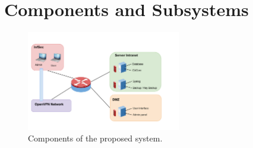 \documentclass[a4paper, toc=index, 12pt, DIV14, twoside, BCOR2cm, headsepline, numbers=noenddot, bibliography=totoc]{report}
\begin{document}
\section{Components and Subsystems}
\begin{figure}[H]
  \centering
    \includegraphics[width=0.6\textwidth]{images/system_components.pdf}  
  \caption{Components of the proposed system.}
  \label{systemcomponents}
\end{figure}
\end{document}
